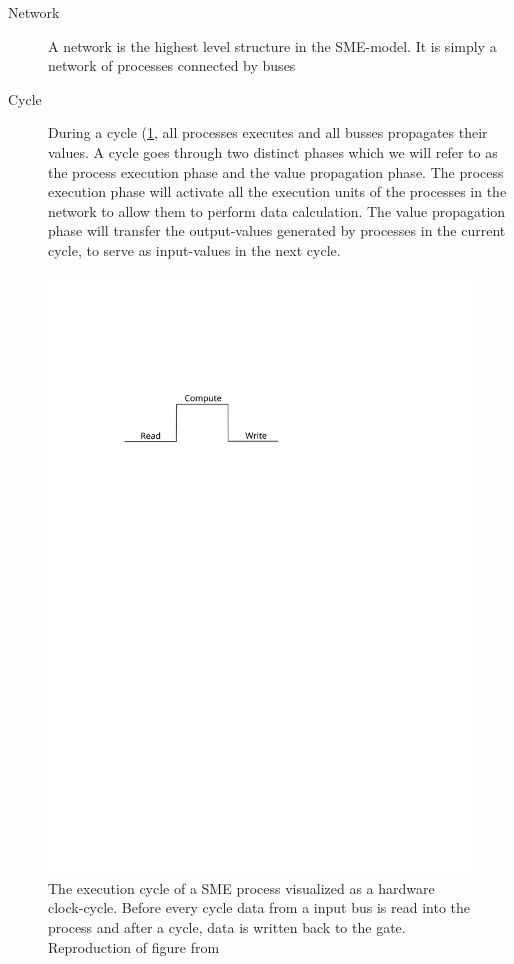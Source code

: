 \begin{description}
  \item[Network] A network is the highest level structure in the
    SME-model. It is simply a network of processes connected by buses
  \item[Cycle] During a cycle (\cref{fig:cycle}, all processes
    executes and all busses propagates their values. A cycle goes
    through two distinct phases which we will refer to as the process
    execution phase and the value propagation phase. The process
    execution phase will activate all the execution units of the
    processes in the network to allow them to perform data
    calculation. The value propagation phase will transfer the
    output-values generated by processes in the current cycle, to
    serve as input-values in the next cycle.
\end{description}
\begin{figure}
\centering
\includegraphics{figures/execution-cycle}
\caption[Execution flow of a SME-process]{The execution cycle of a
  SME process visualized as a hardware clock-cycle. Before every cycle
  data from a input bus is read into the process and after a cycle,
  data is written back to the gate. Reproduction of figure from \cite{vinter2014synchronous}}
\label{fig:cycle}
\end{figure}



